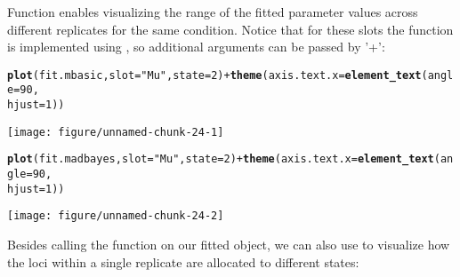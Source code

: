 \documentclass[a4paper,10pt]{article}\usepackage[]{graphicx}\usepackage[]{color}
\makeatletter
\def\maxwidth{ %
  \ifdim\Gin@nat@width>\linewidth
    \linewidth
  \else
    \Gin@nat@width
  \fi
}
\newcommand{\hlnum}[1]{\textcolor[rgb]{0.686,0.059,0.569}{#1}}%
\newcommand{\hlstr}[1]{\textcolor[rgb]{0.192,0.494,0.8}{#1}}%
\newcommand{\hlopt}[1]{\textcolor[rgb]{0,0,0}{#1}}%
\newcommand{\hlstd}[1]{\textcolor[rgb]{0.345,0.345,0.345}{#1}}%
\newcommand{\hlkwc}[1]{\textcolor[rgb]{0.333,0.667,0.333}{#1}}%
\newcommand{\hlkwd}[1]{\textcolor[rgb]{0.737,0.353,0.396}{\textbf{#1}}}%
\newenvironment{kframe}{%
 \def\at@end@of@kframe{}%
 \ifinner\ifhmode%
  \def\at@end@of@kframe{\end{minipage}}%
  \begin{minipage}{\columnwidth}%
 \fi\fi%
 \def\FrameCommand##1{\hskip\@totalleftmargin \hskip-\fboxsep
 \colorbox{shadecolor}{##1}\hskip-\fboxsep
     \hskip-\linewidth \hskip-\@totalleftmargin \hskip\columnwidth}%
 \MakeFramed {\advance\hsize-\width
   \@totalleftmargin\z@ \linewidth\hsize
   \@setminipage}}%
 {\par\unskip\endMakeFramed%
 \at@end@of@kframe}
\newenvironment{knitrout}{}{} %
\makeatother
\begin{document}
Function  enables visualizing the range of the fitted parameter values across different replicates for the same condition. Notice that for these slots the function is implemented using , so additional arguments can be passed by '+':

\begin{knitrout}
\color{fgcolor}\begin{kframe}
\begin{alltt}
\hlkwd{plot}\hlstd{(fit.mbasic,} \hlkwc{slot} \hlstd{=} \hlstr{"Mu"}\hlstd{,} \hlkwc{state} \hlstd{=} \hlnum{2}\hlstd{)} \hlopt{+} \hlkwd{theme}\hlstd{(}\hlkwc{axis.text.x} \hlstd{=} \hlkwd{element_text}\hlstd{(}\hlkwc{angle} \hlstd{=} \hlnum{90}\hlstd{,}
    \hlkwc{hjust} \hlstd{=} \hlnum{1}\hlstd{))}
\end{alltt}
\end{kframe}

{\centering \texttt{[image: figure/unnamed-chunk-24-1]} 

}


\begin{kframe}\begin{alltt}
\hlkwd{plot}\hlstd{(fit.madbayes,} \hlkwc{slot} \hlstd{=} \hlstr{"Mu"}\hlstd{,} \hlkwc{state} \hlstd{=} \hlnum{2}\hlstd{)} \hlopt{+} \hlkwd{theme}\hlstd{(}\hlkwc{axis.text.x} \hlstd{=} \hlkwd{element_text}\hlstd{(}\hlkwc{angle} \hlstd{=} \hlnum{90}\hlstd{,}
    \hlkwc{hjust} \hlstd{=} \hlnum{1}\hlstd{))}
\end{alltt}
\end{kframe}

{\centering \texttt{[image: figure/unnamed-chunk-24-2]} 

}



\end{knitrout}

Besides calling the  function on our fitted object, we can also use  to visualize how the loci within a single replicate are allocated to different states:
\end{document}

